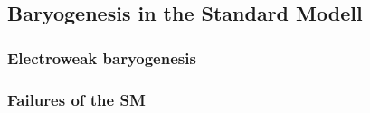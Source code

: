 \subsection{Baryogenesis in the Standard Modell}
\subsubsection{Electroweak baryogenesis}
\subsubsection{Failures of the SM}

